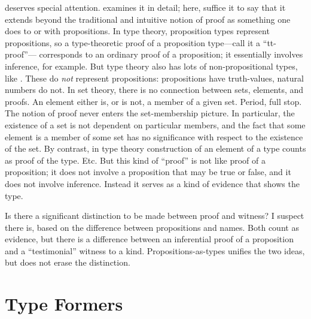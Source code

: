  deserves special
attention.   examines it in detail; here, suffice it
to say that it extends beyond the traditional and intuitive notion of
proof as something one does to or with propositions.  In type theory,
proposition types represent propositions, so a type-theoretic proof
of a proposition type---call it a ``tt-proof''--- corresponds to an
ordinary proof of a proposition; it essentially involves inference,
for example.  But type theory also has lots of non-propositional
types, like \N.  These do \textit{not} represent propositions:
propositions have truth-values, natural numbers do not.  In set
theory, there is no connection between sets, elements, and proofs.  An
element either is, or is not, a member of a given set.  Period, full
stop.  The notion of proof never enters the set-membership
picture.
In particular, the existence of a set is not dependent on particular
members, and the fact that some element is a member of some set has no
significance with respect to the existence of the set.  By contrast,
in type theory construction of an element of a type counts as proof of
the type.  Etc.  But this kind of
``proof'' is not like proof of a proposition; it does not involve a
proposition that may be true or false, and it does not involve
inference.  Instead it serves as a kind of evidence that shows the
type.

\begin{ednote}
  Is there a significant distinction to be made between proof and
  witness?  I suspect there is, based on the difference between
  propositions and names.  Both count as evidence, but there is a
  difference between an inferential proof of a proposition and a
  ``testimonial'' witness to a kind.  Propositions-as-types unifies
  the two ideas, but does not erase the distinction.
\end{ednote}

\section{Type Formers}
\label{subs:hottrules}

